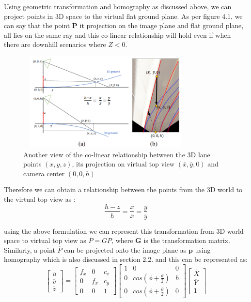     Using geometric transformation and homography as discussed above, we can project points in 3D space to the virtual flat ground plane. As per figure 4.1, we can say that the point \textbf{P} it projection on the image plane and flat ground plane, all lies on the same ray and this co-linear relationship will hold even if when there are downhill scenarios where $Z<0$. 
    
      \begin{figure}[h]
    \centering
    \includegraphics[width=9cm, height=5cm]{images/collinear_3dlane.png}
    \caption{Another view of the co-linear relationship between the 3D lane points $(x,y,z)$, its projection on virtual top view $(\overline{x}, \overline{y},0)$ and camera center $(0,0,h)$ \cite{guo2020gen}}
    \end{figure}

    Therefore we can obtain a relationship between the points from the 3D world to the virtual top view as :
    \begin{equation}
        \frac{h-z}{h} =\frac{x}{\overline{x}}=\frac{y}{\overline{y}} 
    \end{equation}
    
    using the above formulation we can represent this transformation from 3D world space to virtual top view as \textbf{$\overline{P} = GP$}, where \textbf{G} is the transformation matrix. Similarly, a point \textbf{$\overline{P}$} can be projected onto the image plane as $\textbf{p}$ using homography which is also discussed in section 2.2. and this can be represented as: 
    \begin{equation}
       \begin{bmatrix}\overline{u}  \\\overline{v} \\ \overline{z}\end{bmatrix} = \begin{bmatrix} f_{x} & 0& c_{x}  \\0 &f_{x} & c_{y} \\ 0 & 0 & 1     \end{bmatrix}\begin{bmatrix} 1 & 0& 0  \\0 &cos(\phi+ \frac{\theta}{2}) & h \\ 0 &cos(\phi+ \frac{\theta}{2}) & 0     \end{bmatrix}\begin{bmatrix}\overline{X}  \\\overline{Y} \\ 1\end{bmatrix}
    \end{equation}

